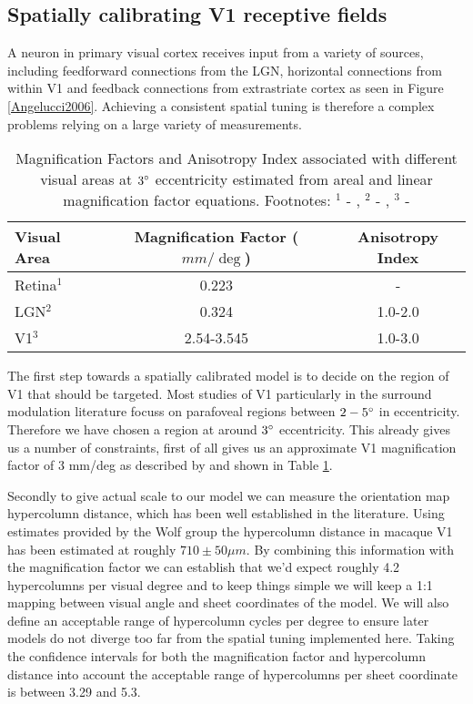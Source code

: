 \subsection{Spatially calibrating V1 receptive fields}

A neuron in primary visual cortex receives input from a variety of
sources, including feedforward connections from the LGN, horizontal
connections from within V1 and feedback connections from extrastriate
cortex as seen in Figure \ref{Angelucci2006}. Achieving a consistent
spatial tuning is therefore a complex problems relying on a large
variety of measurements.

\begin{table}
\centering
\begin{tabular}{l | c c}
  \hline
  \hline
  Visual Area     & Magnification Factor ($mm/\deg$) & Anisotropy Index \\
  \hline
  Retina$^1$      & 0.223                            & -                      \\
  LGN$^2$         & 0.324                             & 1.0-2.0                \\
  V1$^3$          & 2.54-3.545                       & 1.0-3.0                \\
  \hline
\end{tabular}
\caption[]%
{Magnification Factors and Anisotropy Index associated with different visual areas at $3\degree$ eccentricity estimated from areal and linear magnification factor equations. Footnotes: $^1$ - \cite{Perry1985}, $^2$ - \cite{Connolly1984}, $^3$ - \cite{VanEssen1984}}
\label{MFs}
\end{table}

The first step towards a spatially calibrated model is to decide on
the region of V1 that should be targeted. Most studies of V1
particularly in the surround modulation literature focuss on parafoveal
regions between $2-5\degree$ in eccentricity. Therefore we have chosen
a region at around $3\degree$ eccentricity. This already gives us a
number of constraints, first of all gives us an approximate V1
magnification factor of 3 mm/deg as described by \cite{VanEssen1984}
and shown in Table \ref{MFs}.

Secondly to give actual scale to our model we can measure the
orientation map hypercolumn distance, which has been well established
in the literature. Using estimates provided by the Wolf group the
hypercolumn distance in macaque V1 has been estimated at roughly \(710
\pm 50 \mu m\). By combining this information with the magnification
factor we can establish that we'd expect roughly 4.2 hypercolumns per
visual degree and to keep things simple we will keep a 1:1 mapping
between visual angle and sheet coordinates of the model. We will also
define an acceptable range of hypercolumn cycles per degree to ensure
later models do not diverge too far from the spatial tuning
implemented here. Taking the confidence intervals for both the
magnification factor and hypercolumn distance into account the
acceptable range of hypercolumns per sheet coordinate is between 3.29
and 5.3.

